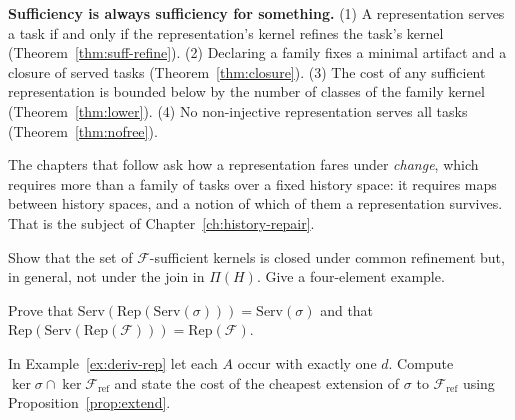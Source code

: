 \begin{principal}
\textbf{Sufficiency is always sufficiency for something.} (1) A representation serves a task if and only if the representation's kernel refines the task's kernel (Theorem~\ref{thm:suff-refine}). (2) Declaring a family fixes a minimal artifact and a closure of served tasks (Theorem~\ref{thm:closure}). (3) The cost of any sufficient representation is bounded below by the number of classes of the family kernel (Theorem~\ref{thm:lower}). (4) No non-injective representation serves all tasks (Theorem~\ref{thm:nofree}).
\end{principal}

The chapters that follow ask how a representation fares under \emph{change}, which requires more than a family of tasks over a fixed history space: it requires maps between history spaces, and a notion of which of them a representation survives. That is the subject of Chapter~\ref{ch:history-repair}.

\begin{exercise}
Show that the set of $\mathcal F$-sufficient kernels is closed under common refinement but, in general, not under the join in $\Pi(H)$. Give a four-element example.
\end{exercise}

\begin{exercise}
Prove that $\mathrm{Serv}(\mathrm{Rep}(\mathrm{Serv}(\sigma)))=\mathrm{Serv}(\sigma)$ and that $\mathrm{Rep}(\mathrm{Serv}(\mathrm{Rep}(\mathcal F)))=\mathrm{Rep}(\mathcal F)$.
\end{exercise}

\begin{exercise}
In Example~\ref{ex:deriv-rep} let each $A$ occur with exactly one $d$. Compute $\ker\sigma\cap\ker\mathcal F_{\mathrm{ref}}$ and state the cost of the cheapest extension of $\sigma$ to $\mathcal F_{\mathrm{ref}}$ using Proposition~\ref{prop:extend}.
\end{exercise}
